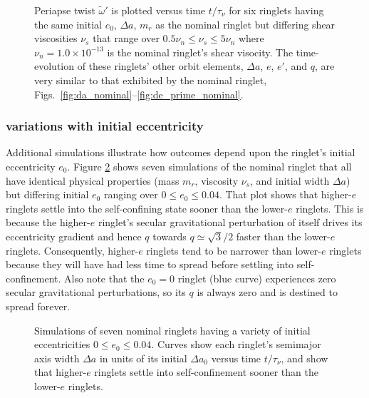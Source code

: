 \documentclass[preprint]{aastex62}
\begin{document}
\begin{figure}
    \caption{
        \label{fig:wt_prime_vs_time}
        Periapse twist $\tilde{\omega}'$ is plotted versus time $t/\tau_\nu$ for six ringlets
        having the same initial $e_0$, $\Delta a$, $m_r$ as the nominal ringlet
        but differing shear viscosities $\nu_s$ that range over $0.5\nu_n\le\nu_s\le5\nu_n$
        where $\nu_n=1.0\times10^{-13}$ is the nominal ringlet's shear visocity.
        The time-evolution of these ringlets' other orbit elements,  $\Delta a$, $e$, $e'$, and $q$,
        are very similar to that exhibited by the nominal ringlet, 
        Figs.\ \ref{fig:da_nominal}--\ref{fig:de_prime_nominal}. 
    }
\end{figure}


\subsubsection{variations with initial eccentricity}
\label{subsec:e-variations}

Additional simulations illustrate how outcomes depend upon the ringlet's initial eccentricity $e_0$.
Figure \ref{fig:e0} shows seven simulations of the nominal ringlet that all have identical
physical properties (mass $m_r$, viscosity $\nu_s$, and initial width $\Delta a$) but differing initial $e_0$ ranging
over $0\le e_0\le 0.04$. That plot shows that higher-$e$ ringlets settle into the
self-confining state sooner than the lower-$e$ ringlets. This is because the higher-$e$ ringlet's
secular gravitational perturbation of itself drives its eccentricity gradient and hence $q$ towards 
$q\simeq\sqrt{3}/2$ faster than the lower-$e$ ringlets. Consequently, 
higher-$e$ ringlets tend to be narrower than lower-$e$ ringlets because they will have had
less time to spread before settling into self-confinement. Also note that the $e_0=0$ ringlet
(blue curve) experiences zero secular gravitational perturbations, so its $q$ is always zero
and is destined to spread forever.

\begin{figure}
    \caption{
        \label{fig:e0}
        Simulations of seven nominal ringlets having a variety of initial eccentricities $0\le e_0\le 0.04$.
        Curves show each ringlet's semimajor axis width $\Delta a$ in units of its initial $\Delta a_0$
        versus time $t/\tau_\nu$, and show that higher-$e$ ringlets settle into self-confinement
        sooner than the lower-$e$ ringlets.
    }
\end{figure}
\end{document}
